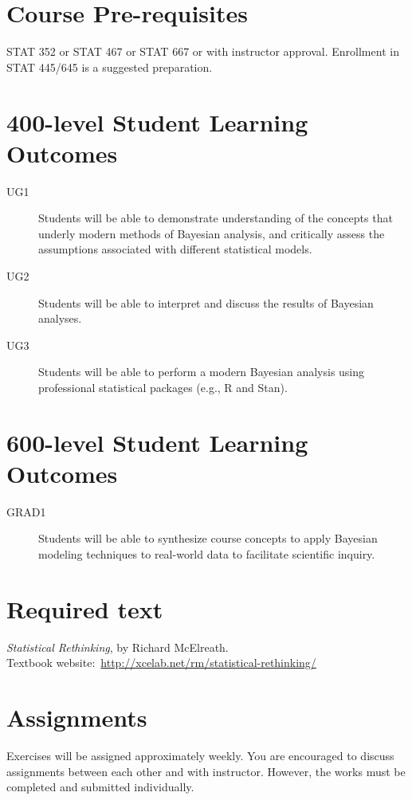 \documentclass[11pt,onecolumn]{article}
\begin{document}
\section*{Course Pre-requisites}
STAT 352 or STAT 467 or STAT 667 or with instructor approval. Enrollment in STAT 445/645 is a suggested preparation.

\section*{400-level Student Learning Outcomes}
\begin{description}
\item[UG1] Students will be able to demonstrate understanding of the concepts that underly modern methods of Bayesian analysis, and critically assess the assumptions associated with different statistical models.
\item[UG2] Students will be able to interpret and discuss the results of Bayesian analyses.
\item[UG3] Students will be able to perform a modern Bayesian analysis using professional statistical packages (e.g., \textsf{R} and \textsf{Stan}).
\end{description}

\section*{600-level Student Learning Outcomes}
\begin{description}
\item[GRAD1] Students will be able to synthesize course concepts to apply Bayesian modeling techniques to real-world data to facilitate scientific inquiry.
\end{description}

\section*{Required text}
\emph{Statistical Rethinking}, by Richard McElreath. \\
Textbook website:~\url{http://xcelab.net/rm/statistical-rethinking/}

\section*{Assignments}
Exercises will be assigned approximately weekly. You are encouraged to discuss  assignments between each other and with instructor. However, the works must be completed and submitted individually.
\end{document}
